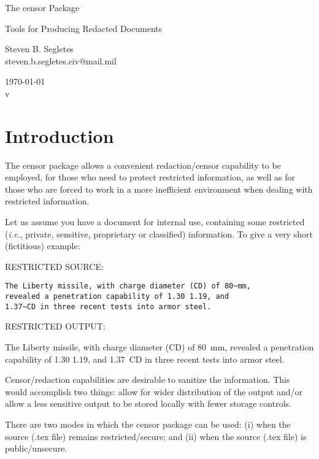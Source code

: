 \documentclass{article}
\begin{document}
\vspace*{0in}
\begin{center}
\LARGE The \textsf{censor} Package\\
\small \rule{0in}{1em}Tools for Producing Redacted Documents\\
\large \rule{0in}{2em} Steven B. Segletes\\
steven.b.segletes.civ@mail.mil\\
\rule{0em}{2em}\today\\
v\censorversionnumber
\end{center}

\section{Introduction}

The \textsf{censor} package allows a convenient redaction/censor
capability to be employed, for those who need to protect restricted
information, as well as for those who are forced to work in a more
inefficient environment when dealing with restricted information.

Let us assume you have a document for internal use, containing some
restricted (\textit{i.e.}, private, sensitive, proprietary or
classified) information.  To give a very short (fictitious) example:

{\addtolength{\leftskip}{2.3em}
RESTRICTED SOURCE: \hrulefill

\verb|The Liberty missile, with charge diameter (CD) of 80~mm, |\\
\verb|revealed a penetration capability of 1.30 1.19, and |\\
\verb|1.37~CD in three recent tests into armor steel.|

RESTRICTED OUTPUT: \hrulefill

The Liberty missile, with charge diameter (CD) of 80~mm, revealed a
penetration capability of 1.30 1.19, and 1.37~CD in three recent tests
into armor steel.

\hrulefill

}

Censor/redaction capabilities are desirable to sanitize the information.
This would accomplish two things:  allow for wider distribution of the
output and/or allow a less sensitive output to be stored locally with
fewer storage controls.

There are two modes in which the censor package can be used: (i) when
the source (.tex file) remains restricted/secure; and (ii) when the source
(.tex file) is public/unsecure.
\end{document}
